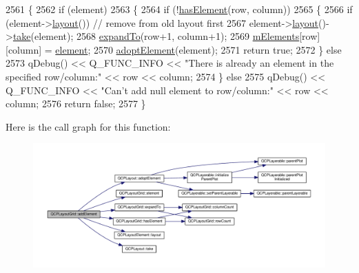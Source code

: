 \begin{DoxyCode}
2561 \{
2562   \textcolor{keywordflow}{if} (element)
2563   \{
2564     \textcolor{keywordflow}{if} (!\hyperlink{class_q_c_p_layout_grid_ab0cf4f7edc9414a3bfaddac0f46dc0a0}{hasElement}(row, column))
2565     \{
2566       \textcolor{keywordflow}{if} (element->\hyperlink{class_q_c_p_layout_element_a6235f5384db871fc6e3387a1bc558b0d}{layout}()) \textcolor{comment}{// remove from old layout first}
2567         element->\hyperlink{class_q_c_p_layout_element_a6235f5384db871fc6e3387a1bc558b0d}{layout}()->\hyperlink{class_q_c_p_layout_ada26cd17e56472b0b4d7fbbc96873e4c}{take}(element);
2568       \hyperlink{class_q_c_p_layout_grid_a886c0dcbabd51a45da399e044552b685}{expandTo}(row+1, column+1);
2569       \hyperlink{class_q_c_p_layout_grid_a3577d3855bf8ad20ef9079291a49f397}{mElements}[row][column] = \hyperlink{class_q_c_p_layout_grid_a525f25e6ba43ee228151d074251b4e6a}{element};
2570       \hyperlink{class_q_c_p_layout_af6dbbc24156a808da29cd1ec031729a3}{adoptElement}(element);
2571       \textcolor{keywordflow}{return} \textcolor{keyword}{true};
2572     \} \textcolor{keywordflow}{else}
2573       qDebug() << Q\_FUNC\_INFO << \textcolor{stringliteral}{"There is already an element in the specified row/column:"} << row << 
      column;
2574   \} \textcolor{keywordflow}{else}
2575     qDebug() << Q\_FUNC\_INFO << \textcolor{stringliteral}{"Can't add null element to row/column:"} << row << column;
2576   \textcolor{keywordflow}{return} \textcolor{keyword}{false};
2577 \}
\end{DoxyCode}


Here is the call graph for this function\+:\nopagebreak
\begin{figure}[H]
\begin{center}
\leavevmode
\includegraphics[width=350pt]{class_q_c_p_layout_grid_adff1a2ca691ed83d2d24a4cd1fe17012_cgraph}
\end{center}
\end{figure}




